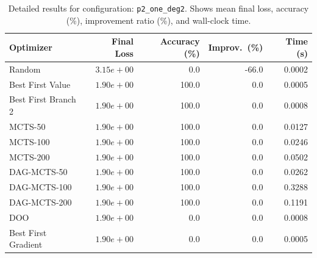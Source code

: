 \begin{table}[H]
\centering
\caption{Detailed results for configuration: \texttt{p2\_one\_deg2}. Shows mean final loss, accuracy (\%), improvement ratio (\%), and wall-clock time.}
\label{tab:funclearn-detail-4}
\begin{tabular}{lrrrr}
\toprule
Optimizer & Final Loss & Accuracy (\%) & Improv.~(\%) & Time (s) \\
\midrule
Random & $3.15e+00$ & 0.0 & -66.0 & 0.0002 \\
\hline
Best First Value & \textbf{$1.90e+00$} & 100.0 & 0.0 & 0.0005 \\
\hline
Best First Branch 2 & \textbf{$1.90e+00$} & 100.0 & 0.0 & 0.0008 \\
\hline
MCTS-50 & \textbf{$1.90e+00$} & 100.0 & 0.0 & 0.0127 \\
\hline
MCTS-100 & \textbf{$1.90e+00$} & 100.0 & 0.0 & 0.0246 \\
\hline
MCTS-200 & \textbf{$1.90e+00$} & 100.0 & 0.0 & 0.0502 \\
\hline
DAG-MCTS-50 & \textbf{$1.90e+00$} & 100.0 & 0.0 & 0.0262 \\
\hline
DAG-MCTS-100 & \textbf{$1.90e+00$} & 100.0 & 0.0 & 0.3288 \\
\hline
DAG-MCTS-200 & \textbf{$1.90e+00$} & 100.0 & 0.0 & 0.1191 \\
\hline
DOO & \textbf{$1.90e+00$} & 0.0 & 0.0 & 0.0008 \\
\hline
Best First Gradient & \textbf{$1.90e+00$} & 0.0 & 0.0 & 0.0005 \\
\bottomrule
\end{tabular}
\end{table}

